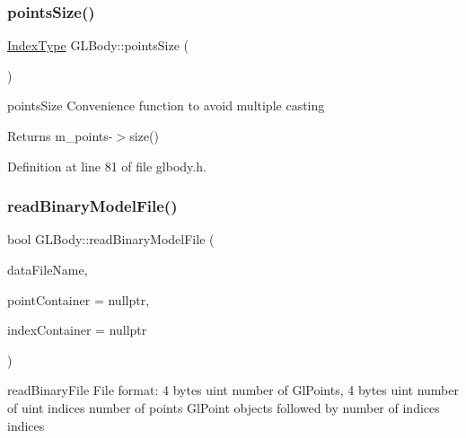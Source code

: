 \mbox{\label{class_g_l_body_ab49318c0af2044a32ec6e7833a6224c1}} 
\subsubsection{\texorpdfstring{pointsSize()}{pointsSize()}}
{\footnotesize\ttfamily \mbox{\hyperlink{gldefines_8h_af3c748960f29c42e5b7f1dc449ab66ff}{Index\+Type}} G\+L\+Body\+::points\+Size (\begin{DoxyParamCaption}{ }\end{DoxyParamCaption})\hspace{0.3cm}{\ttfamily [inline]}}



points\+Size Convenience function to avoid multiple casting 

\begin{DoxyReturn}{Returns}
m\+\_\+points-\/$>$size() 
\end{DoxyReturn}


Definition at line 81 of file glbody.\+h.

\mbox{\label{class_g_l_body_ad6f12ae3d48aa96561138a8c91fab68a}} 
\subsubsection{\texorpdfstring{readBinaryModelFile()}{readBinaryModelFile()}}
{\footnotesize\ttfamily bool G\+L\+Body\+::read\+Binary\+Model\+File (\begin{DoxyParamCaption}\item[{const Q\+String \&}]{data\+File\+Name,  }\item[{Q\+Vector$<$ \mbox{\hyperlink{class_g_l_point}{G\+L\+Point}} $>$ $\ast$}]{point\+Container = {\ttfamily nullptr},  }\item[{Q\+Vector$<$ G\+Lushort $>$ $\ast$}]{index\+Container = {\ttfamily nullptr} }\end{DoxyParamCaption})\hspace{0.3cm}{\ttfamily [virtual]}}



read\+Binary\+File File format\+: 4 bytes uint number of Gl\+Points, 4 bytes uint number of uint indices number of points Gl\+Point objects followed by number of indices indices 


